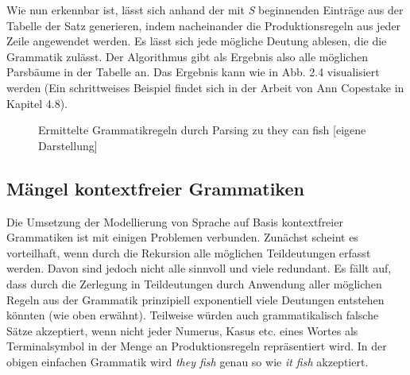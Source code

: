 \documentclass[12pt]{report}
\begin{document}
Wie nun erkennbar ist, lässt sich anhand der mit \textit{S} beginnenden Einträge aus der Tabelle der Satz generieren, indem nacheinander die Produktionsregeln aus jeder Zeile angewendet werden. Es lässt sich jede mögliche Deutung ablesen, die die Grammatik zulässt. Der Algorithmus gibt als Ergebnis also alle möglichen Parsbäume in der Tabelle an. Das Ergebnis kann wie in Abb. 2.4 visualisiert werden (Ein schrittweises Beispiel findet sich in der Arbeit von Ann Copestake \cite{cop04} in Kapitel 4.8).
\begin{figure}[h!]
\begin{center}
\caption{Ermittelte Grammatikregeln durch Parsing zu \glqq  they can fish\grqq{} [eigene Darstellung]}
\end{center}
\end{figure}

\subsection{Mängel kontextfreier Grammatiken}
Die Umsetzung der Modellierung von Sprache auf Basis kontextfreier Grammatiken ist mit einigen Problemen verbunden. Zunächst scheint es vorteilhaft, wenn durch die Rekursion alle möglichen Teildeutungen erfasst werden. Davon sind jedoch nicht alle sinnvoll und viele redundant. Es fällt auf, dass durch die Zerlegung in Teildeutungen durch Anwendung aller möglichen Regeln aus der Grammatik prinzipiell exponentiell viele Deutungen entstehen könnten (wie oben erwähnt). Teilweise würden auch grammatikalisch falsche Sätze akzeptiert, wenn nicht jeder Numerus, Kasus etc. eines Wortes als Terminalsymbol in der Menge an Produktionsregeln repräsentiert wird. In der obigen einfachen Grammatik wird \textit{\glqq  they fish\grqq{}} genau so wie \textit{\glqq  it fish\grqq{}} akzeptiert. 
\end{document}
